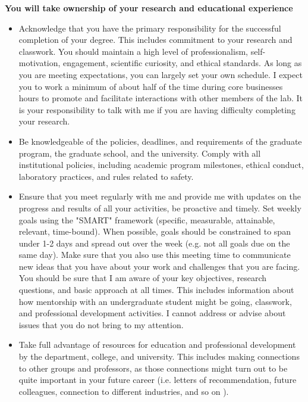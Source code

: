 \documentclass{article}
\begin{document}
\textbf{You will take ownership of your research and educational experience}
\begin{itemize}
	\item Acknowledge that you have the primary responsibility for the successful completion of
	your degree. This includes commitment to your research and classwork. You
	should maintain a high level of professionalism, self-motivation, engagement, scientific curiosity,
	and ethical standards.  As long as you are
	meeting expectations, you can largely set your own schedule. I expect you to work a minimum of about half of the time during core businesses hours to promote and facilitate interactions with other members of the lab. It is your responsibility to talk with me if you are having difficulty completing your research. 
	\item Be knowledgeable of the policies, deadlines, and requirements of the graduate program,
	the graduate school, and the university. Comply with all institutional policies, including academic
	program milestones, ethical conduct, laboratory practices, and rules related to safety.
	\item Ensure that you meet regularly with me and provide me with updates on the progress and
	results of all your activities, be proactive and timely. Set weekly goals using the "SMART" framework (specific, measurable, attainable, relevant, time-bound). When possible, goals should be constrained to span under 1-2 days and spread out over the week (e.g. not all goals due on the same day).
	Make sure that you also use this meeting time to communicate
	new ideas that you have about your work and challenges that you are facing. You should be sure that I am aware of your key objectives, research questions, and basic approach at all times. This includes information about how mentorship with an undergraduate student might be going, classwork, and professional development activities.
	I cannot address or advise about issues that you do not bring to my attention.
	\item Take full advantage of resources for education and professional development by the department, college, and university. This includes making connections to other groups and professors, as those connections might turn out to be quite important in your future career (i.e. letters of recommendation, future colleagues, connection to different industries, and so on ).
\end{itemize}
\end{document}

